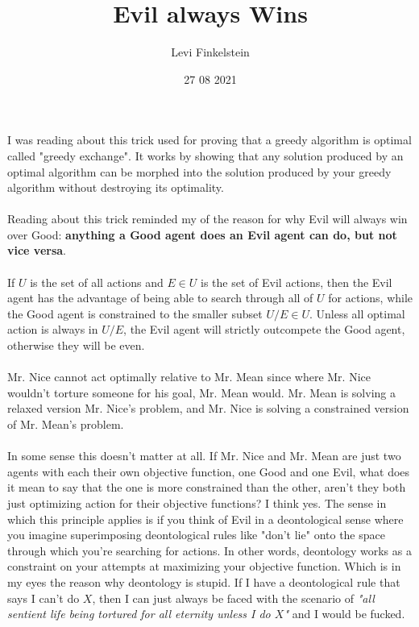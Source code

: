 \usepackage{pgfplots}
\title{Evil always Wins}
\author{Levi Finkelstein}
\date{27 08 2021}

\maketitle

I was reading about this trick used for proving that a greedy algorithm is optimal called "greedy exchange". It works by showing that any solution produced by an optimal algorithm can be morphed into the solution produced by your greedy algorithm without destroying its optimality.
\\\\
Reading about this trick reminded my of the reason for why Evil will always win over Good: \textbf{anything a Good agent does an Evil agent can do, but not vice versa}.
\\\\
If $U$ is the set of all actions and $E\in U$ is the set of Evil actions, then the Evil agent has the advantage of being able to search through all of $U$ for actions, while the Good agent is constrained to the smaller subset $U/E\in U$. Unless all optimal action is always in $U/E$, the Evil agent will strictly outcompete the Good agent, otherwise they will be even.
\\\\
Mr. Nice cannot act optimally relative to Mr. Mean since where Mr. Nice wouldn't torture someone for his goal, Mr. Mean would. Mr. Mean is solving a relaxed version Mr. Nice's problem, and Mr. Nice is solving a constrained version of Mr. Mean's problem.
\\\\
In some sense this doesn't matter at all. If Mr. Nice and Mr. Mean are just two agents with each their own objective function, one Good and one Evil, what does it mean to say that the one is more constrained than the other, aren't they both just optimizing action for their objective functions? I think yes. The sense in which this principle applies is if you think of Evil in a deontological sense where you imagine superimposing deontological rules like "don't lie" onto the space through which you're searching for actions. In other words, deontology works as a constraint on your attempts at maximizing your objective function. Which is in my eyes the reason why deontology is stupid. If I have a deontological rule that says I can't do $X$, then I can just always be faced with the scenario of \textit{"all sentient life being tortured for all eternity unless I do $X$"} and I would be fucked.
